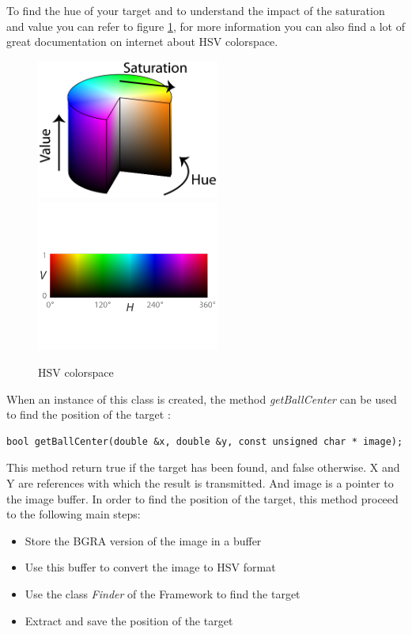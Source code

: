 \documentclass[a4paper, 12pt]{article}  		%
\begin{document}
To find the hue of your target and to understand the impact of the saturation and value you can refer to figure \ref{HSV}, for more information you can also find a lot of great documentation on internet about HSV colorspace.\\ 
\begin{figure}[H]
\begin{center}
\includegraphics[width=6cm]{HSV.png}
\includegraphics[width=6cm]{HV.png}
\caption{HSV colorspace}
\label{HSV}
\end{center}
\end{figure}

\newpage
When an instance of this class is created, the method \textit{getBallCenter} can be used to find the position of the target :\\

\lstset{language=c++} 
\lstset{commentstyle=\textit} 
\begin{lstlisting} 
bool getBallCenter(double &x, double &y, const unsigned char * image);
\end{lstlisting}
 
This method return true if the target has been found, and false otherwise. X and Y are references with which the result is transmitted. And image is a pointer to the image buffer. In order to find the position of the target, this method proceed to the following main steps:\\
\begin{itemize}
\item Store the BGRA version  of the image in a buffer
\item Use this buffer to convert the image to HSV format
\item Use the class \textit{Finder} of the Framework to find the target
\item Extract and save the position of the target
\end{itemize}
\end{document}
